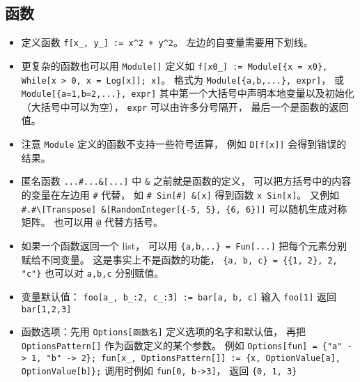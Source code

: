 \subsection{函数}
\begin{itemize}
\item 定义函数 \verb|f[x_, y_] := x^2 + y^2|。 左边的自变量需要用下划线。
\item 更复杂的函数也可以用 \verb|Module[]| 定义如 \verb|f[x0_] := Module[{x = x0}, While[x > 0, x = Log[x]]; x]|。 格式为 \verb|Module[{a,b,...}, expr]|， 或 \verb|Module[{a=1,b=2,...}, expr]| 其中第一个大括号中声明本地变量以及初始化（大括号中可以为空）， \verb|expr| 可以由许多分号隔开， 最后一个是函数的返回值。
\item 注意 \verb|Module| 定义的函数不支持一些符号运算， 例如 \verb|D[f[x]]| 会得到错误的结果。
\item 匿名函数 \verb|...#...&[...]| 中 \verb|&| 之前就是函数的定义， 可以把方括号中的内容的变量在左边用 \verb|#| 代替， 如 \verb|# Sin[#] &[x]| 得到函数 \verb|x Sin[x]|。 又例如 \verb|#.#\[Transpose] &[RandomInteger[{-5, 5}, {6, 6}]]| 可以随机生成对称矩阵。 也可以用 \verb|@| 代替方括号。
\item 如果一个函数返回一个 list， 可以用 \verb|{a,b,..} = Fun[...]| 把每个元素分别赋给不同变量。 这是事实上不是函数的功能， \verb|{a, b, c} = {{1, 2}, 2, "c"}| 也可以对 \verb|a,b,c| 分别赋值。
\item 变量默认值： \verb|foo[a_, b_:2, c_:3] := bar[a, b, c]| 输入 \verb|foo[1]| 返回 \verb|bar[1,2,3]|
\item 函数选项：先用 \verb|Options[函数名]| 定义选项的名字和默认值， 再把 \verb|OptionsPattern[]| 作为函数定义的某个参数。 例如 \verb|Options[fun] = {"a" -> 1, "b" -> 2}; fun[x_, OptionsPattern[]] := {x, OptionValue[a], OptionValue[b]};| 调用时例如 \verb|fun[0, b->3]|， 返回 \verb|{0, 1, 3}|
\end{itemize}

